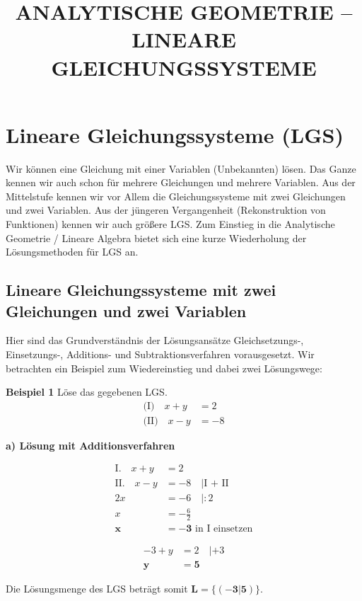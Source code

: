 \documentclass{article}
\title{ANALYTISCHE GEOMETRIE – LINEARE GLEICHUNGSSYSTEME}
\author{}
\date{}
\begin{document}
\maketitle

\section{Lineare Gleichungssysteme (LGS)}

Wir können eine Gleichung mit einer Variablen (Unbekannten) lösen. Das Ganze kennen wir auch schon für mehrere Gleichungen und mehrere Variablen. Aus der Mittelstufe kennen wir vor Allem die Gleichungssysteme mit zwei Gleichungen und zwei Variablen. Aus der jüngeren Vergangenheit (Rekonstruktion von Funktionen) kennen wir auch größere LGS. Zum Einstieg in die Analytische Geometrie / Lineare Algebra bietet sich eine kurze Wiederholung der Lösungsmethoden für LGS an.

\subsection{Lineare Gleichungssysteme mit zwei Gleichungen und zwei Variablen}

Hier sind das Grundverständnis der Lösungsansätze Gleichsetzungs-, Einsetzungs-, Additions- und Subtraktionsverfahren vorausgesetzt. Wir betrachten ein Beispiel zum Wiedereinstieg und dabei zwei Lösungswege:

\textbf{Beispiel 1} Löse das gegebenen LGS.
\begin{align*}
\text{(I)} \quad x + y &= 2\\
\text{(II)} \quad x - y &= -8
\end{align*}

\textbf{a) Lösung mit Additionsverfahren}

\begin{align*}
\text{I.} \quad x + y &= 2\\
\text{II.} \quad x - y &= -8 \quad |\text{I + II}\\
2x &= -6 \quad |: 2\\
x &= -\frac{6}{2}\\
\mathbf{x} &= \mathbf{-3} \text{ in I einsetzen}
\end{align*}

\begin{align*}
-3 + y &= 2 \quad |+3\\
\mathbf{y} &= \mathbf{5}
\end{align*}

Die Lösungsmenge des LGS beträgt somit $\mathbf{L = \{(-3|5)\}}$.
\end{document}
